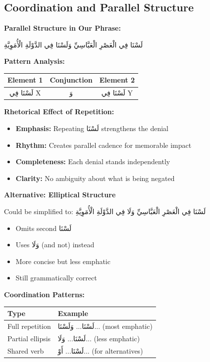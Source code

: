\documentclass[letterpaper,12pt]{article}
\begin{document}
\subsection{Coordination and Parallel Structure}

\begin{tcolorbox}[colback=boxcolor,colframe=headercolor,breakable]
\textbf{Parallel Structure in Our Phrase:}

\textarabic{لَسْنَا فِي الْعَصْرِ الْعَبَّاسِيِّ وَلَسْنَا فِي الدَّوْلَةِ الْأُمَوِيَّةِ}

\textbf{Pattern Analysis:}
\begin{center}
\begin{tabular}{|c|c|c|}
\hline
\textbf{Element 1} & \textbf{Conjunction} & \textbf{Element 2} \\
\hline
\textarabic{لَسْنَا فِي X} & \textarabic{وَ} & \textarabic{لَسْنَا فِي Y} \\
\hline
\end{tabular}
\end{center}

\textbf{Rhetorical Effect of Repetition:}
\begin{itemize}
\item \textbf{Emphasis:} Repeating \textarabic{لَسْنَا} strengthens the denial
\item \textbf{Rhythm:} Creates parallel cadence for memorable impact
\item \textbf{Completeness:} Each denial stands independently
\item \textbf{Clarity:} No ambiguity about what is being negated
\end{itemize}

\textbf{Alternative: Elliptical Structure}

Could be simplified to:
\textarabic{لَسْنَا فِي الْعَصْرِ الْعَبَّاسِيِّ وَلَا فِي الدَّوْلَةِ الْأُمَوِيَّةِ}

\begin{itemize}
\item Omits second \textarabic{لَسْنَا}
\item Uses \textarabic{وَلَا} (and not) instead
\item More concise but less emphatic
\item Still grammatically correct
\end{itemize}

\textbf{Coordination Patterns:}

\begin{tabular}{|l|p{8cm}|}
\hline
\textbf{Type} & \textbf{Example} \\
\hline
Full repetition & \textarabic{لَسْنَا... وَلَسْنَا...} (most emphatic) \\
\hline
Partial ellipsis & \textarabic{لَسْنَا... وَلَا...} (less emphatic) \\
\hline
Shared verb & \textarabic{لَسْنَا... أَوْ...} (for alternatives) \\
\hline
\end{tabular}
\end{tcolorbox}
\end{document}
